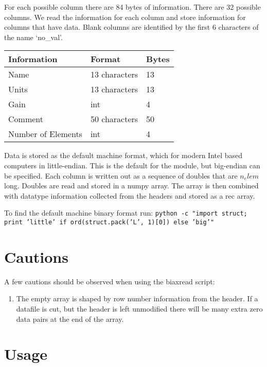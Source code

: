For each possible column there are 84 bytes of information.  There are 32 possible columns.  We read the information for each column and store information for columns that have data.  Blank columns are identified by the first 6 characters of the name `no\_val'.  

\begin{table}[h]
	\begin{center}
	\begin{tabular}{| l | l | l |}
		\hline
		Information & Format & Bytes\\
		\hline
		Name & 13 characters &  13\\
		\hline
		Units & 13 characters &  13 \\
		\hline
		Gain & int & 4\\
		\hline
		Comment & 50 characters & 50\\
		\hline
		Number of Elements & int & 4\\
		\hline
	\end{tabular}
	\end{center}
	\label{BinaryColHeadFormat}
\end{table}

Data is stored as the default machine format, which for modern Intel based computers in little-endian.  This is the default for the module, but big-endian can be specified.  Each column is written out as a sequence of doubles that are $n_elem$ long.  Doubles are read and stored in a numpy array.  The array is then combined with datatype information collected from the headers and stored as a rec array.

To find the default machine binary format run: \texttt{python -c "import struct; print 'little' if ord(struct.pack('L', 1)[0]) else 'big'"}

\section{Cautions}
A few cautions should be observed when using the biaxread script:

\begin{enumerate}
\item The empty array is shaped by row number information from the header.  If a datafile is cut, but the header is left unmodified there will be many extra zero data pairs at the end of the array.
\end{enumerate}

\section{Usage}

